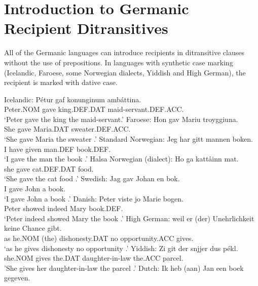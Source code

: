 \documentclass[11pt]{upenndiss}
\begin{document}
\section{Introduction to Germanic Recipient Ditransitives}
All of the Germanic languages can introduce recipients in ditransitive clauses without the use of prepositions. In languages with synthetic case marking (Icelandic, Faroese, some Norwegian dialects, Yiddish and High German), the recipient is marked with dative case.

\begin{exe}
\ex
\begin{xlist}
\ex Icelandic:
\gll P\'{e}tur gaf konunginum amb\'{a}ttina.\\
Peter.NOM gave king.DEF.DAT maid-servant.DEF.ACC.\\
\trans `Peter gave the king the maid-servant.'
\ex Faroese:
\gll Hon gav Mariu troyggiuna.\\
She gave Maria.DAT sweater.DEF.ACC.\\
\trans `She gave Maria the sweater \citep{Lundquist.2013b}.'
\ex Standard Norwegian:
\gll Jeg har gitt mannen boken.\\
I have given man.DEF book.DEF.\\
\trans `I gave the man the book \citep[ex 10]{Sprouse.1995}.'
\ex Halsa Norwegian (dialect):
\gll Ho ga kattåinn mat.\\
she gave cat.DEF.DAT food.\\
\trans `She gave the cat food \citep{Afarli.2012}.'
\ex Swedish:
\gll Jag gav Johan en bok.\\
I gave John a book.\\
\trans `I gave John a book \citep{Holmberg.1995}.'
\ex Danish:
\gll Peter viste jo Marie bogen.\\
Peter showed indeed Mary book.DEF.\\
\trans `Peter indeed showed Mary the book \citep{Vikner.1989}.'
\ex High German:
\gll weil er (der) Unehrlichkeit keine Chance gibt.\\
as he.NOM (the) dishonesty.DAT no opportunity.ACC gives.\\
\trans `as he gives dishonesty no opportunity \citep[162]{Draye.1996}.'
\ex Yiddish:
\gll Zi git der snjjer dus pékl. \\
she.NOM gives the.DAT daughter-in-law the.ACC parcel.\\
\trans 'She gives her daughter-in-law the parcel \citep[ex 190a]{Birnbaum.1979}.'
\ex Dutch:
\gll Ik heb (aan) Jan een boek gegeven.\\

\end{xlist}
\end{exe}
\end{document}
